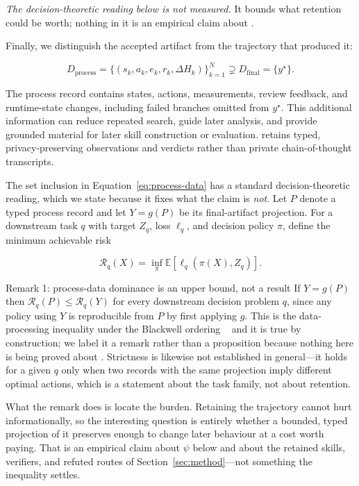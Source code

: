 \emph{The decision-theoretic reading below is not measured.} It bounds what retention
could be worth; nothing in it is an empirical claim about \systemname.

Finally, we distinguish the accepted artifact from the
trajectory that produced it:

\begin{equation}
  D_{\mathrm{process}}
  =\{(s_k,a_k,e_k,r_k,\Delta H_k)\}_{k=1}^{N}
  \supsetneq
  D_{\mathrm{final}}=\{y^\star\}.
  \label{eq:process-data}
\end{equation}

The process record contains states, actions, measurements, review feedback, and
runtime-state changes, including failed branches omitted from $y^\star$. This
additional information can reduce repeated search, guide later analysis, and provide
grounded material for later skill construction or evaluation. \systemname retains
typed, privacy-preserving observations and verdicts rather than private
chain-of-thought transcripts.

The set inclusion in Equation~\ref{eq:process-data} has a standard
decision-theoretic reading, which we state because it fixes what the claim is
\emph{not}. Let $P$ denote a typed process record and let
$Y=g(P)$ be its final-artifact projection. For a downstream task $q$ with target
$Z_q$, loss $\ell_q$, and decision policy $\pi$, define the minimum achievable risk

\begin{equation}
  \mathcal{R}_q(X)
  =\inf_{\pi}\mathbb{E}\!\left[\ell_q\!\left(\pi(X),Z_q\right)\right].
  \label{eq:downstream-risk}
\end{equation}

\begin{paperbox}{Remark 1: process-data dominance is an upper bound, not a result}
If $Y=g(P)$ then $\mathcal{R}_q(P)\leq\mathcal{R}_q(Y)$ for every downstream decision
problem $q$, since any policy using $Y$ is reproducible from $P$ by first applying
$g$. This is the data-processing inequality under the Blackwell ordering
~\citep{blackwell1953equivalent} and it is true by construction; we label it a remark
rather than a proposition because nothing here is being proved about \systemname.
Strictness is likewise not established in general---it holds for a given $q$ only
when two records with the same projection imply different optimal actions, which is a
statement about the task family, not about retention.

What the remark does is locate the burden. Retaining the trajectory cannot hurt
informationally, so the interesting question is entirely whether a bounded, typed
projection of it preserves enough to change later behaviour at a cost worth paying.
That is an empirical claim about $\psi$ below and about the retained skills,
verifiers, and refuted routes of Section~\ref{sec:method}---not something the
inequality settles.
\end{paperbox}

